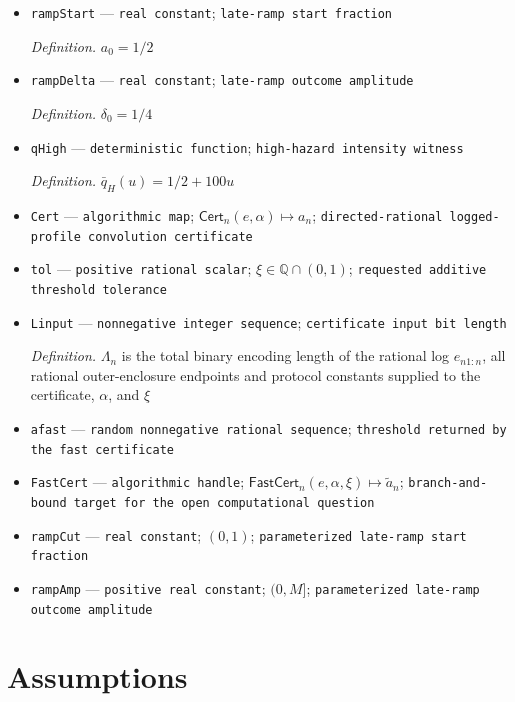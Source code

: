 \documentclass{article}
\begin{document}
\begin{itemize}
  \item \texttt{rampStart} --- \texttt{real constant}; \texttt{late-\allowbreak{}ramp start fraction}
  \par\smallskip\noindent\emph{Definition.} \(a_0=1/2\)
  \item \texttt{rampDelta} --- \texttt{real constant}; \texttt{late-\allowbreak{}ramp outcome amplitude}
  \par\smallskip\noindent\emph{Definition.} \(\delta_0=1/4\)
  \item \texttt{qHigh} --- \texttt{deterministic function}; \texttt{high-\allowbreak{}hazard intensity witness}
  \par\smallskip\noindent\emph{Definition.} \(\bar q_H(u)=1/2+100u\)
  \item \texttt{Cert} --- \texttt{algorithmic map}; \(\mathsf{Cert}_n(e,\alpha)\mapsto a_n\); \texttt{directed-\allowbreak{}rational logged-\allowbreak{}profile convolution certificate}
  \item \texttt{tol} --- \texttt{positive rational scalar}; \(\xi\in\mathbb Q\cap(0,1)\); \texttt{requested additive threshold tolerance}
  \item \texttt{Linput} --- \texttt{nonnegative integer sequence}; \texttt{certificate input bit length}
  \par\smallskip\noindent\emph{Definition.} \(\Lambda_n\) is the total binary encoding length of the rational log \(e_{n1:n}\), all rational outer-enclosure endpoints and protocol constants supplied to the certificate, \(\alpha\), and \(\xi\)
  \item \texttt{afast} --- \texttt{random nonnegative rational sequence}; \texttt{threshold returned by the fast certificate}
  \item \texttt{FastCert} --- \texttt{algorithmic handle}; \(\mathsf{FastCert}_n(e,\alpha,\xi)\mapsto\widetilde a_n\); \texttt{branch-\allowbreak{}and-\allowbreak{}bound target for the open computational question}
  \item \texttt{rampCut} --- \texttt{real constant}; \((0,1)\); \texttt{parameterized late-\allowbreak{}ramp start fraction}
  \item \texttt{rampAmp} --- \texttt{positive real constant}; \((0,M]\); \texttt{parameterized late-\allowbreak{}ramp outcome amplitude}
\end{itemize}

\section{Assumptions}
\end{document}

